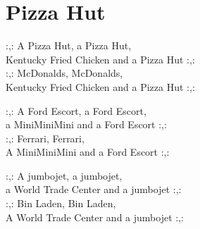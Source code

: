 \section{Pizza Hut}
:,: A Pizza Hut, a Pizza Hut,\\
Kentucky Fried Chicken and a Pizza Hut :,:\\
:,: McDonalds, McDonalds,\\
Kentucky Fried Chicken and a Pizza Hut :,:

:,: A Ford Escort, a Ford Escort,\\
a MiniMiniMini and a Ford Escort :,:\\
:,: Ferrari, Ferrari,\\
A MiniMiniMini and a Ford Escort :,:

:,: A jumbojet, a jumbojet,\\
a World Trade Center and a jumbojet :,:\\
:,: Bin Laden, Bin Laden,\\
A World Trade Center and a jumbojet :,: